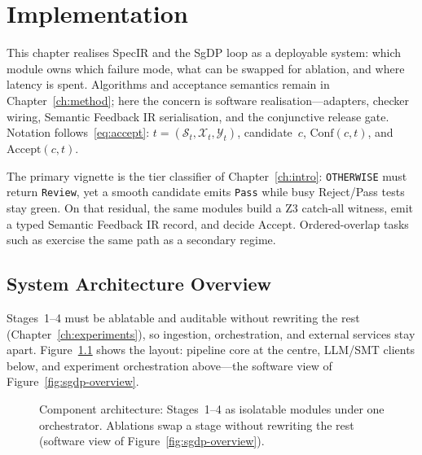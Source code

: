 
\chapter{Implementation}
\label{ch:implementation}

This chapter realises SpecIR and the SgDP loop as a deployable system:
which module owns which failure mode, what can be swapped for ablation, and
where latency is spent.
Algorithms and acceptance semantics remain in Chapter~\ref{ch:method};
here the concern is software realisation---adapters, checker wiring,
Semantic Feedback IR serialisation, and the conjunctive release gate.
Notation follows~\eqref{eq:accept}:
$t = (\mathcal{S}_t, \mathcal{X}_t, \mathcal{Y}_t)$, candidate~$c$,
$\mathrm{Conf}(c,t)$, and $\mathrm{Accept}(c,t)$.

The primary vignette is the tier classifier of Chapter~\ref{ch:intro}:
\texttt{OTHERWISE} must return \texttt{Review}, yet a smooth candidate
emits \texttt{Pass} while busy Reject/Pass tests stay green.
On that residual, the same modules build a Z3 catch-all witness, emit a
typed Semantic Feedback IR record, and decide $\mathrm{Accept}$.
Ordered-overlap tasks such as  exercise the same
path as a secondary regime.

\section{System Architecture Overview}
\label{sec:impl:architecture}

Stages~1--4 must be ablatable and auditable without rewriting the rest
(Chapter~\ref{ch:experiments}), so ingestion, orchestration, and external
services stay apart.
Figure~\ref{fig:component-arch} shows the layout: pipeline core at the
centre, LLM/SMT clients below, and experiment orchestration above---the
software view of Figure~\ref{fig:sgdp-overview}.

\begin{figure}[t]
  \centering
  \caption{Component architecture: Stages~1--4 as isolatable modules under one
    orchestrator.
    Ablations swap a stage without rewriting the rest (software view of
    Figure~\ref{fig:sgdp-overview}).}
  \label{fig:component-arch}
\end{figure}

